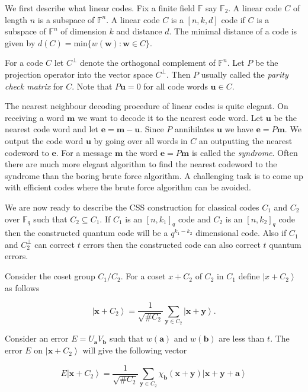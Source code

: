 \documentclass[11pt,twoside]{article}
\theoremstyle{definition}
\theoremstyle{remark}
\newcommand{\Weight}[1]{\ensuremath{w\left(#1\right)}}
\newcommand{\ket}[1]{\ensuremath{\left\vert #1 \right\rangle}}
\newcommand{\GF}[0]{\ensuremath{\mathbb{F}}}
\begin{document}
We first describe what linear codes. Fix a finite field $\mathbb{F}$
say $\mathbb{F}_2$.  A linear code $C$ of length $n$ is a subspace of
$\mathbb{F}^n$. A linear code $C$ is a $[n,k,d]$ code if $C$ is a
subspace of $\mathbb{F}^n$ of dimension $k$ and distance $d$. The
minimal distance of a code is given by $d(C) = \textrm{min}\{
\Weight{\mathbf{w}} : \mathbf{w} \in C \}$. 

For a code $C$ let $C^\perp$ denote the orthogonal complement of
$\mathbb{F}^n$. Let $P$ be the projection operator into the vector
space $C^\perp$. Then $P$ usually called the \emph{parity check
  matrix} for $C$. Note that $P \mathbf{u} = 0$ for all code words
$\mathbf{u} \in C$.

The nearest neighbour decoding procedure of linear codes is quite
elegant. On receiving a word $\mathbf{m}$ we want to decode it to the
nearest code word. Let $\mathbf{u}$ be the nearest code word and let
$\mathbf{e} = \mathbf{m} - \mathbf{u}$. Since $P$ annihilates
$\mathbf{u}$ we have $\mathbf{e} = P \mathbf{m}$. We output the code
word $\mathbf{u}$ by going over all words in $C$ an outputting the
nearest codeword to $\mathbf{e}$. For a message $\mathbf{m}$ the word
$\mathbf{e} = P \mathbf{m}$ is called the \emph{syndrome}. Often there
are much more elegant algorithm to find the nearest codeword to the
syndrome than the boring brute force algorithm. A challenging task is
to come up with efficient codes where the brute force algorithm can be
avoided.

We are now ready to describe the CSS construction for classical codes
$C_1$ and $C_2$ over $\GF_q$ such that $C_2 \subseteq C_1$. If $C_1$
is an $[n,k_1]_q$ code and $C_2$ is an $[n,k_2]_q$ code then the
constructed quantum code will be a $q^{k_1 - k_2}$ dimensional code.
Also if $C_1$ and $C_2^\perp$ can correct $t$ errors then the
constructed code can also correct $t$ quantum errors.

Consider the coset group $C_1/C_2$. For a coset $x + C_2$ of $C_2$ in
$C_1$ define $\ket{x + C_2}$ as follows

\[
\ket{\mathbf{x}+ C_2} = \frac{1}{\sqrt{\# C_2}} \sum_{\mathbf{y} \in
    C_2} \ket{\mathbf{x} + \mathbf{y}}.
\]

Consider an error $E = U_{\mathbf{a}}V_{\mathbf{b}}$ such that
$\Weight{\mathbf{a}}$ and $\Weight{\mathbf{b}}$ are less than $t$.
The error $E$ on $\ket{\mathbf{x}+ C_2}$ will give the following
vector

\[
E \ket{\mathbf{x} + C_2} =\frac{1}{\sqrt{\# C_2}} \sum_{\mathbf{y} \in
  C_2} \chi_{\mathbf{b}}(\mathbf{x}+\mathbf{y})
\ket{\mathbf{x}+\mathbf{y}+\mathbf{a}}
\]
\end{document}
